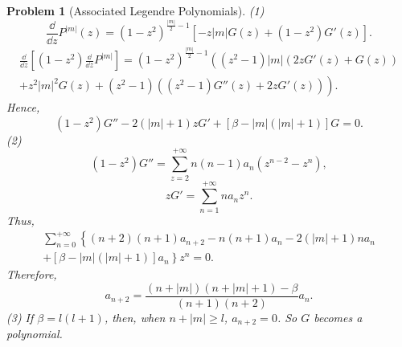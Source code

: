 \documentclass{article}
\theoremstyle{1}
\newtheorem{problem}{Problem}
\begin{document}
\begin{problem}[Associated Legendre Polynomials]
    (1)
    \begin{equation}
        \frac{\dd}{\dd{z}}P^{|m|} (z)=\left(1-z^2\right)^{\frac{|m|}{2}-1}\left[-z|m|G(z)+\left(1-z^2\right)G'(z)\right].
    \end{equation}
    \begin{equation}
        \begin{aligned}
           \frac{\dd}{\dd{z}}\left[(1-z^2)\frac{\dd}{\dd{z}}P^{| m| }\right] =\left(1-z^2\right)^{\frac{| m| }{2}-1} \left(\left(z^2-1\right) | m|  \left(2 z
       G'(z)+G(z)\right)\right.\\
       \left.
       +z^2 | m| ^2 G(z)+\left(z^2-1\right) \left(\left(z^2-1\right)
       G''(z)+2 z G'(z)\right)\right).
        \end{aligned}
    \end{equation}
    Hence,
    \begin{equation}
        (1 - z^2)G'' - 2(|m| + 1)zG' + \left[\beta - |m|(|m| + 1)\right] G = 0.
    \end{equation}
    (2) 
    \begin{equation}
        (1-z^2)G''=\sum_{z=2}^{+\infty}n(n-1)a_n\left(z^{n-2}-z^n\right),
    \end{equation}
    \begin{equation}
        zG'=\sum_{n=1}^{+\infty}na_nz^n.
    \end{equation}
    Thus, 
    \begin{equation}
        \begin{aligned}
            \sum_{n=0}^{+\infty}\left\{(n+2)(n+1)a_{n+2}-n(n+1)a_n-2(|m|+1)na_n\right.\\
            \left.+\left[\beta-|m|(|m|+1)\right]a_n\right\}z^n=0.
        \end{aligned}
    \end{equation}
    Therefore,
    \begin{equation}
        a_{n+2}=\frac{\left(n+|m|\right)\left(n+|m|+1\right)-\beta}{(n+1)(n+2)}a_n.
    \end{equation}
    (3) If $\beta=l(l+1)$, then, when $n+\left|m\right|\ge l$, $a_{n+2}=0$. So $G$ becomes a polynomial.
\end{problem}
\end{document}
